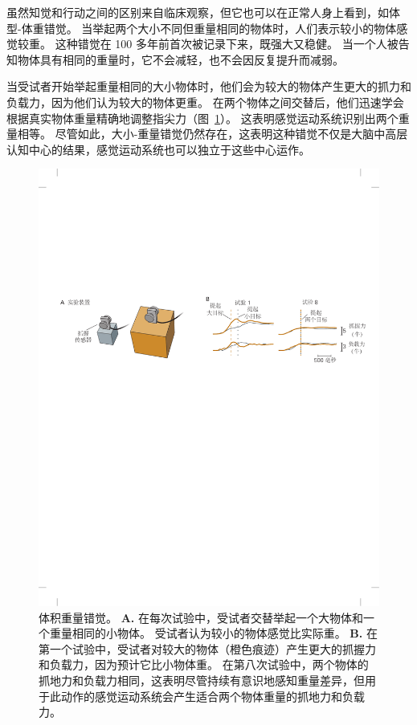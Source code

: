 虽然知觉和行动之间的区别来自临床观察，但它也可以在正常人身上看到，如体型-体重错觉。
当举起两个大小不同但重量相同的物体时，人们表示较小的物体感觉较重。
这种错觉在 100 多年前首次被记录下来，既强大又稳健。
当一个人被告知物体具有相同的重量时，它不会减轻，也不会因反复提升而减弱。


当受试者开始举起重量相同的大小物体时，他们会为较大的物体产生更大的抓力和负载力，因为他们认为较大的物体更重。
在两个物体之间交替后，他们迅速学会根据真实物体重量精确地调整指尖力（图~\ref{fig:30_7}）。 
这表明感觉运动系统识别出两个重量相等。
尽管如此，大小-重量错觉仍然存在，这表明这种错觉不仅是大脑中高层认知中心的结果，感觉运动系统也可以独立于这些中心运作。


\begin{figure}[htbp]
	\centering
	\includegraphics[width=1.0\linewidth]{chap30/fig_30_7}
	\caption{体积重量错觉。
		\textbf{A.} 在每次试验中，受试者交替举起一个大物体和一个重量相同的小物体。
		受试者认为较小的物体感觉比实际重。
		\textbf{B.} 在第一个试验中，受试者对较大的物体（橙色痕迹）产生更大的抓握力和负载力，因为预计它比小物体重。
		在第八次试验中，两个物体的抓地力和负载力相同，这表明尽管持续有意识地感知重量差异，但用于此动作的感觉运动系统会产生适合两个物体重量的抓地力和负载力\cite{flanagan2000independence}。}
	\label{fig:30_7}
\end{figure}



